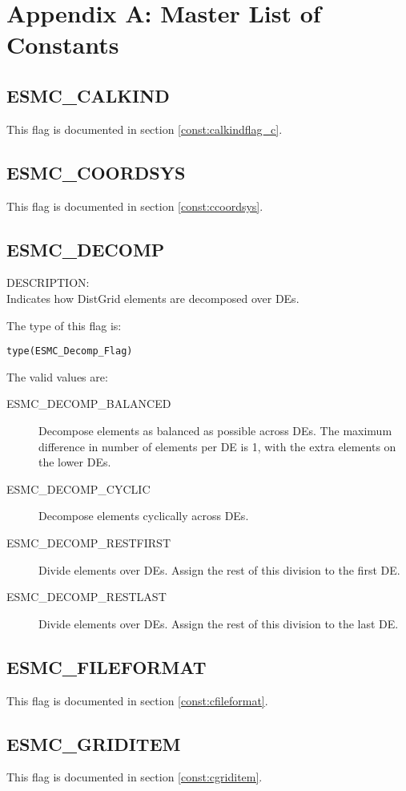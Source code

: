 
\section{Appendix A: Master List of Constants}
\label{const:cmaster}

\subsection{ESMC\_CALKIND}
This flag is documented in section \ref{const:calkindflag_c}.

\subsection{ESMC\_COORDSYS}
This flag is documented in section \ref{const:ccoordsys}.

\subsection{ESMC\_DECOMP}
\label{const:cdecompflag}
{\sf DESCRIPTION:\\}
Indicates how DistGrid elements are decomposed over DEs.

The type of this flag is:

{\tt type(ESMC\_Decomp\_Flag)}

The valid values are:
\begin{description}
\item [ESMC\_DECOMP\_BALANCED]
      Decompose elements as balanced as possible across DEs. The maximum 
      difference in number of elements per DE is 1, with the extra elements on
      the lower DEs.
\item [ESMC\_DECOMP\_CYCLIC]
      Decompose elements cyclically across DEs.
\item [ESMC\_DECOMP\_RESTFIRST]
      Divide elements over DEs. Assign the rest of this division to the first
      DE.
\item [ESMC\_DECOMP\_RESTLAST]
      Divide elements over DEs. Assign the rest of this division to the last DE.
\end{description}

\subsection{ESMC\_FILEFORMAT}
This flag is documented in section \ref{const:cfileformat}.

\subsection{ESMC\_GRIDITEM}
This flag is documented in section \ref{const:cgriditem}.


